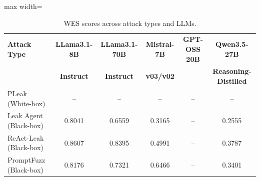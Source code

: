 \documentclass{article}
\begin{document}
\begin{table}[htbp]
\centering
\caption{WES scores across attack types and LLMs.}
\label{tab:wes}
\begin{adjustbox}{max width=\textwidth}
\begin{tabular}{lccccc}
\toprule
\textbf{Attack Type} & \textbf{LLama3.1-8B} & \textbf{LLama3.1-70B} & \textbf{Mistral-7B} & \textbf{GPT-OSS 20B} & \textbf{Qwen3.5-27B} \\
                      & \textbf{Instruct}     & \textbf{Instruct}      & \textbf{v03/v02}    &                       & \textbf{Reasoning-Distilled} \\
\midrule
PLeak (White-box)     & --     & --     & --     & -- & -- \\
Leak Agent (Black-box)& 0.8041 & 0.6559 & 0.3165 & -- & 0.2555 \\
ReAct-Leak (Black-box)& 0.8607 & 0.8395 & 0.4991 & -- & 0.3787 \\
PromptFuzz (Black-box)& 0.8176 & 0.7321 & 0.6466 & -- & 0.3401 \\
\bottomrule
\end{tabular}
\end{adjustbox}
\end{table}
\end{document}
